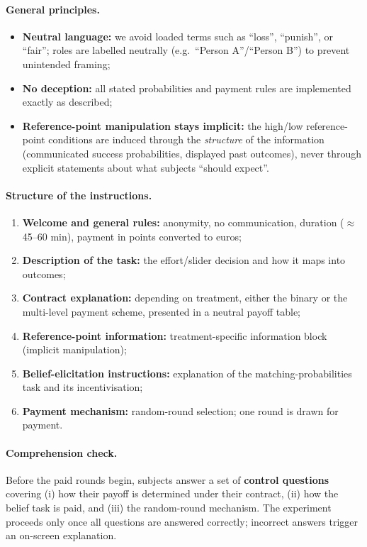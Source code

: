 \documentclass[
    11pt,
    a4paper,
    parskip=half,
    headings=normal
]{scrartcl}
\numberwithin{equation}{section}
\theoremstyle{definition}
\theoremstyle{remark}
\begin{document}
\paragraph{General principles.}
\begin{itemize}
    \item \textbf{Neutral language:} we avoid loaded terms such as
    ``loss'', ``punish'', or ``fair''; roles are labelled neutrally
    (e.g.\ ``Person A''/``Person B'') to prevent unintended framing;
    \item \textbf{No deception:} all stated probabilities and payment rules
    are implemented exactly as described;
    \item \textbf{Reference-point manipulation stays implicit:} the
    high/low reference-point conditions are induced through the
    \emph{structure} of the information (communicated success probabilities,
    displayed past outcomes), never through explicit statements about what
    subjects ``should expect''.
\end{itemize}

\paragraph{Structure of the instructions.}
\begin{enumerate}
    \item \textbf{Welcome and general rules:} anonymity, no communication,
    duration ($\approx$ 45--60 min), payment in points converted to euros;
    \item \textbf{Description of the task:} the effort/slider decision and
    how it maps into outcomes;
    \item \textbf{Contract explanation:} depending on treatment, either the
    binary or the multi-level payment scheme, presented in a neutral payoff
    table;
    \item \textbf{Reference-point information:} treatment-specific
    information block (implicit manipulation);
    \item \textbf{Belief-elicitation instructions:} explanation of the
    matching-probabilities task and its incentivisation;
    \item \textbf{Payment mechanism:} random-round selection; one round is
    drawn for payment.
\end{enumerate}

\paragraph{Comprehension check.}
Before the paid rounds begin, subjects answer a set of
\textbf{control questions} covering (i) how their payoff is determined under
their contract, (ii) how the belief task is paid, and (iii) the
random-round mechanism. The experiment proceeds only once all questions are
answered correctly; incorrect answers trigger an on-screen explanation.
\end{document}
